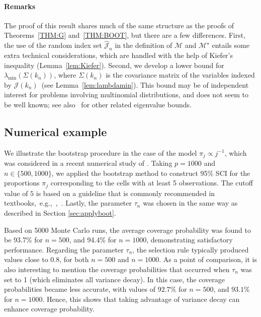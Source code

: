 \documentclass[aos,preprint]{imsart}
\numberwithin{equation}{section}
\theoremstyle{plain}
\renewcommand{\hat}[1]{\widehat{#1}}
\newcommand{\J}{\mathcal{J}}
\newcommand{\1}{{\bf{1}}}
\newcommand{\0}{\mathbf{0}}
\begin{document}
\paragraph{Remarks} The proof of this result shares much of the same structure as the proofs of Theorems~\ref{THM:G} and~\ref{THM:BOOT}, but there are a few differences. First, the use of the random index set $\hat\J_n$ in the definition of $\mathcal{M}$ and $\mathcal{M}^{\star}$ entails some extra technical considerations, which are handled with the help of Kiefer's inequality (Lemma~\ref{lem:Kiefer}). Second, we develop a lower bound for $\lambda_{\min}(\Sigma(k_n))$, where $\Sigma(k_n)$ is the covariance matrix of the variables indexed by $\J(k_n)$~(see Lemma~\ref{lem:lambdamin}). This bound may be of independent interest for problems involving multinomial distributions, and does not seem to be well known; see also~\citep{Benasseni:2012} for other related eigenvalue bounds.


\subsection{Numerical example}\label{sec:M2}
We illustrate the bootstrap procedure in the case of the model $\pi_j\propto j^{-1}$, which was considered in a recent numerical study of \cite{Balakrishnan:2018}. 
Taking $p=1000$ and \mbox{$n\in\{500,1000\}$,} we applied the bootstrap method to construct 95\% SCI for the proportions $\pi_j$ corresponding to the cells with at least 5 observations. 
The cutoff value of $5$ is based on a guideline that is commonly recommended in textbooks,~e.g.,~\cite[p.19]{Agresti:2003},~\cite[p.519]{Rice:2007}.
%
Lastly, the parameter $\tau_n$ was chosen in the same way as described in Section \ref{sec:applyboot}.

Based on  5000 Monte Carlo runs, the average coverage probability was found to be 93.7\% for $n=500$, and 94.4\% for $n=1000$, demonstrating satisfactory performance. Regarding the parameter $\tau_n$, the selection rule typically produced values close to 0.8, for both $n=500$ and $n=1000$. As a point of comparison, it is also interesting to mention the coverage probabilities that occurred when $\tau_n$ was set to 1 (which eliminates all variance decay). In this case, the coverage probabilities became less accurate, with values of $92.7\%$ for $n=500$, and $93.1\%$ for $n=1000$. Hence, this shows that taking advantage of variance decay can enhance coverage probability. 
\end{document}
